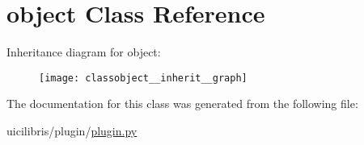 \hypertarget{classobject}{\section{object \-Class \-Reference}
\label{classobject}
}


\-Inheritance diagram for object\-:
\nopagebreak
\begin{figure}[H]
\begin{center}
\leavevmode
\texttt{[image: classobject\_\_inherit\_\_graph]}
\end{center}
\end{figure}


\-The documentation for this class was generated from the following file\-:\begin{DoxyCompactItemize}
\item 
uicilibris/plugin/\hyperlink{plugin_8py}{plugin.\-py}\end{DoxyCompactItemize}
